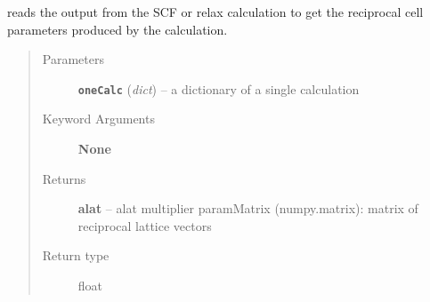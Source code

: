 \documentclass[letterpaper,10pt,english]{sphinxmanual}
\begin{document}

\begin{fulllineitems}
\label{retr:retr.getRecipParams}
reads the output from the SCF or relax calculation to get the
reciprocal cell parameters produced by the calculation.
\begin{quote}\begin{description}
\item[{Parameters}] \leavevmode
\textbf{\texttt{oneCalc}} (\emph{dict}) -- a dictionary of a single calculation

\item[{Keyword Arguments}] \leavevmode
\textbf{None}

\item[{Returns}] \leavevmode
\textbf{alat} --
alat multiplier
paramMatrix (numpy.matrix): matrix of reciprocal lattice vectors

\item[{Return type}] \leavevmode
float

\end{description}\end{quote}

\end{fulllineitems}


\begin{fulllineitems}
\label{retr:retr.get_parameters}
\end{fulllineitems}


\begin{fulllineitems}
\label{retr:retr.glideXshiftY}
\end{fulllineitems}


\begin{fulllineitems}
\label{retr:retr.glideXshiftZ}
\end{fulllineitems}
\end{document}
